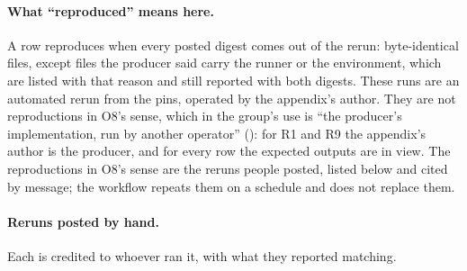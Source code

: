 \paragraph{What ``reproduced'' means here.} A row reproduces when every posted digest comes out of the rerun: byte-identical files, except files the producer said carry the runner or the environment, which are listed with that reason and still reported with both digests. These runs are an automated rerun from the pins, operated by the appendix's author. They are not reproductions in O8's sense, which in the group's use is ``the producer's implementation, run by another operator'' (): for R1 and R9 the appendix's author is the producer, and for every row the expected outputs are in view. The reproductions in O8's sense are the reruns people posted, listed below and cited by message; the workflow repeats them on a schedule and does not replace them.

\paragraph{Reruns posted by hand.} Each is credited to whoever ran it, with what they reported matching.

